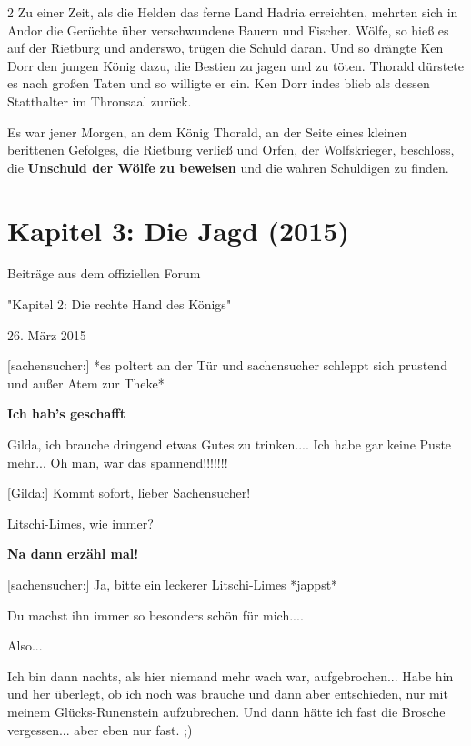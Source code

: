 \documentclass[10pt, a4paper, oneside]{book}
\newcommand{\storytext}[2][]{%
        \section{#2}%
        \label{storytext-#1}%
    }
\newcommand{\fillbreak}{\vspace*{\fill}\columnbreak}
\begin{document}
\begin{multicols}{2}
Zu einer Zeit, als die Helden das ferne Land Hadria erreichten, mehrten sich in Andor die Gerüchte über verschwundene Bauern und Fischer. Wölfe, so hieß es auf der Rietburg und anderswo, trügen die Schuld daran. Und so drängte Ken Dorr den jungen König dazu, die Bestien zu jagen und zu töten. Thorald dürstete es nach großen Taten und so willigte er ein. Ken Dorr indes blieb als dessen Statthalter im Thronsaal zurück.\bigskip

Es war jener Morgen, an dem König Thorald, an der Seite eines kleinen berittenen Gefolges, die Rietburg verließ und Orfen, der Wolfskrieger, beschloss, die \textbf{Unschuld der Wölfe zu beweisen} und die wahren Schuldigen zu finden.












\fillbreak
\storytext[2015-kapitel-3-die-jagd]{Kapitel 3: Die Jagd (2015)}








\begin{center}
    Beiträge aus dem offiziellen Forum
    
    "Kapitel 2: Die rechte Hand des Königs"
    
    26. März 2015
\end{center}

[sachensucher:] *es poltert an der Tür und sachensucher schleppt sich prustend und außer Atem zur Theke*

\textbf{Ich hab's geschafft}

Gilda, ich brauche dringend etwas Gutes zu trinken.... Ich habe gar keine Puste mehr... Oh man, war das spannend!!!!!!!

[Gilda:] Kommt sofort, lieber Sachensucher!

Litschi-Limes, wie immer?

\textbf{Na dann erzähl mal!}

[sachensucher:] Ja, bitte ein leckerer Litschi-Limes *jappst*

Du machst ihn immer so besonders schön für mich....

Also...

Ich bin dann nachts, als hier niemand mehr wach war, aufgebrochen... Habe hin und her überlegt, ob ich noch was brauche und dann aber entschieden, nur mit meinem Glücks-Runenstein aufzubrechen. Und dann hätte ich fast die Brosche vergessen... aber eben nur fast. ;)


\end{multicols}
\end{document}
